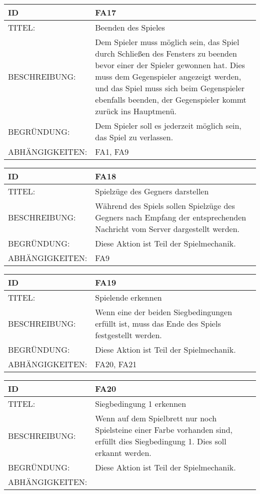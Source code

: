 \documentclass{uulm-assignment}
\begin{document}
\begin{tabularx}{16cm}{l|X}
\textbf{ID} & \textbf{FA17} \\
\hline
TITEL: & Beenden des Spieles\\
\hline
BESCHREIBUNG: & Dem Spieler muss möglich sein, das Spiel durch Schließen des Fensters  zu beenden bevor einer der Spieler gewonnen hat.
Dies muss dem Gegenspieler angezeigt werden, und das Spiel muss sich beim Gegenspieler ebenfalls beenden, der Gegenspieler kommt zurück ins Hauptmenü.
\\
\hline
BEGRÜNDUNG: & Dem Spieler soll es jederzeit möglich sein, das Spiel zu verlassen.\\
\hline
ABHÄNGIGKEITEN: & FA1, FA9 \\
\end{tabularx}

\begin{tabularx}{16cm}{l|X}
\textbf{ID} & \textbf{FA18} \\
\hline
TITEL: & Spielzüge des Gegners darstellen \\
\hline
BESCHREIBUNG: & Während des Spiels sollen Spielzüge des Gegners nach Empfang der entsprechenden Nachricht vom Server dargestellt werden.
\\
\hline
BEGRÜNDUNG: & Diese Aktion ist Teil der Spielmechanik. \\
\hline
ABHÄNGIGKEITEN: & FA9 \\
\end{tabularx}

\begin{tabularx}{16cm}{l|X}
\textbf{ID} & \textbf{FA19} \\
\hline
TITEL: & Spielende erkennen \\
\hline
BESCHREIBUNG: & Wenn eine der beiden Siegbedingungen erfüllt ist, muss das Ende des Spiels festgestellt werden.
\\
\hline
BEGRÜNDUNG: & Diese Aktion ist Teil der Spielmechanik. \\
\hline
ABHÄNGIGKEITEN: & FA20, FA21 \\
\end{tabularx}

\begin{tabularx}{16cm}{l|X}
\textbf{ID} & \textbf{FA20} \\
\hline
TITEL: & Siegbedingung 1 erkennen \\
\hline
BESCHREIBUNG: & Wenn auf dem Spielbrett nur noch Spielsteine einer Farbe vorhanden sind, erfüllt dies Siegbedingung 1. Dies soll erkannt werden.
\\
\hline
BEGRÜNDUNG: & Diese Aktion ist Teil der Spielmechanik. \\
\hline
ABHÄNGIGKEITEN: & \\
\end{tabularx}
\end{document}
